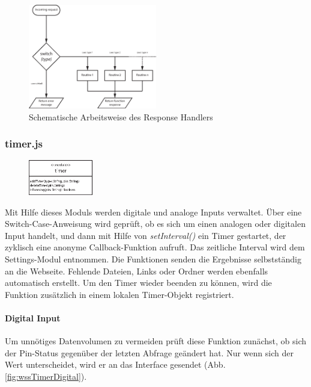 \begin{figure}[ht]
\centering
\includegraphics[width = 0.5\textwidth]{documentation/images/wssResponseHandler.eps}
\caption{Schematische Arbeitsweise des Response Handlers}
\label{fig:wssResponseHandler}
\end{figure}


\subsubsection{timer.js}

\begin{figure}
\vspace{-14pt}
\centering
\includegraphics[width = 0.25\textwidth]{documentation/images/apiTimer.eps}
\end{figure}

Mit Hilfe dieses Moduls werden digitale und analoge Inputs verwaltet. Über eine Switch-Case-Anweisung wird geprüft, ob es sich um einen analogen oder digitalen Input handelt, und dann mit Hilfe von \textit{setInterval()} ein Timer gestartet, der zyklisch eine anonyme Callback-Funktion aufruft. Das zeitliche Interval wird dem Settings-Modul entnommen. Die Funktionen senden die Ergebnisse selbstständig an die Webseite. Fehlende Dateien, Links oder Ordner werden ebenfalls automatisch erstellt. Um den Timer wieder beenden zu können, wird die Funktion zusätzlich in einem lokalen Timer-Objekt registriert.

\paragraph{Digital Input} Um unnötiges Datenvolumen zu vermeiden prüft diese Funktion zunächst, ob sich der Pin-Status gegenüber der letzten Abfrage geändert hat. Nur wenn sich der Wert unterscheidet, wird er an das Interface gesendet (Abb. \ref{fig:wssTimerDigital}).

